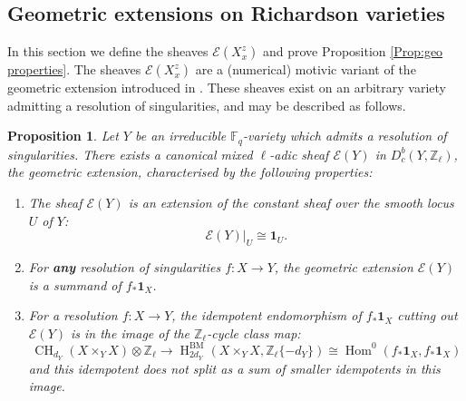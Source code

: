 \documentclass[11pt]{article}
\DeclareMathOperator{\Hom}{Hom}
\DeclareMathOperator{\CH}{\mathrm{CH}}
\DeclareMathOperator{\hH}{\mathrm{H}}
\newtheorem{prop}[thm]{Proposition}
\theoremstyle{remark}
\theoremstyle{definition}
\begin{document}
\subsection{Geometric extensions on Richardson varieties}
\label{subsection:geometric extensions on rich}

In this section we define the sheaves $\mathscr{E}(X^z_x)$ and prove Proposition \ref{Prop:geo properties}. The sheaves $\mathscr{E}(X^z_x)$ are a (numerical) motivic variant of the geometric extension introduced in \cite{HW23,McN18}. These sheaves exist on an arbitrary variety admitting a resolution of singularities, and may be described as follows.

\begin{prop}\label{prop:char of geo exts}
Let $Y$ be an irreducible $
\mathbb{F}_q$-variety which admits a resolution of singularities. There exists a canonical mixed $\ell$-adic sheaf $\mathscr{E}(Y)$ in $D^b_c(Y,\mathbb{Z}_\ell)$, the geometric extension, characterised by the following properties:\begin{enumerate}
    \item The sheaf $\mathscr{E}(Y)$ is an extension of the constant sheaf over the smooth locus $U$ of $Y$:
    \[\mathscr{E}(Y)|_U\cong \mathbf{1}_U.\]
    \item For \textbf{any} resolution of singularities $f:X\to Y$, the geometric extension $\mathscr{E}(Y)$ is a summand of $f_*\mathbf{1}_X$.
    \item For a resolution $f:X\to Y$, the idempotent endomorphism of $f_*\mathbf{1}_X$ cutting out $\mathscr{E}(Y)$ is in the image of the $\mathbb{Z}_\ell$-cycle class map: \[\CH_{d_Y}(X\times_Y X)\otimes \mathbb{Z}_\ell\to \hH^{\text{BM}}_{2d_Y}(X\times_Y X,\mathbb{Z}_\ell\{-d_Y\})\cong \Hom^0(f_*\mathbf{1}_X,f_*\mathbf{1}_X)\] and this idempotent does not split as a sum of smaller idempotents in this image.
\end{enumerate}
\end{prop}
\end{document}
